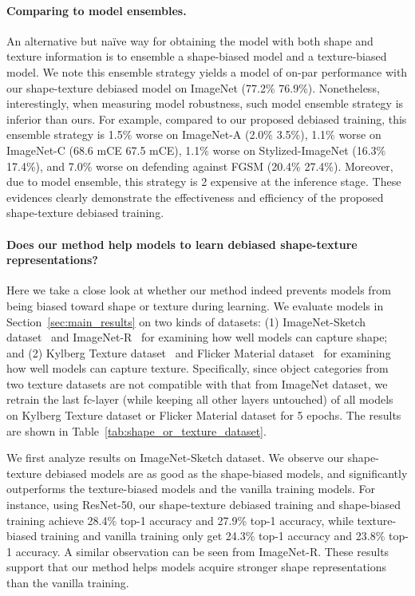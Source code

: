 \documentclass{article} \usepackage{iclr2021_conference,times}
\def\vs{{\bm{s}}}
\begin{document}
\paragraph{Comparing to model ensembles.}
An alternative but na\"ive way for obtaining the model with both shape and texture information is to ensemble a shape-biased model and a texture-biased model. We note this ensemble strategy yields a model of on-par performance with our shape-texture debiased model on ImageNet (77.2\% \vs 76.9\%). Nonetheless, interestingly, 
when measuring model robustness, such model ensemble strategy is inferior than ours. For example, compared to our proposed debiased training, this ensemble strategy is 1.5\% worse on ImageNet-A (2.0\% \vs 3.5\%), 1.1\% worse on ImageNet-C (68.6 mCE \vs 67.5 mCE), 1.1\% worse on Stylized-ImageNet (16.3\% \vs 17.4\%), and 7.0\% worse on defending against FGSM (20.4\% \vs 27.4\%). Moreover, due to model  ensemble, this strategy is 2 expensive at the inference stage. These evidences clearly demonstrate the effectiveness and efficiency of the proposed shape-texture debiased training.



\paragraph{Does our method help models to learn debiased shape-texture representations?}
Here we take a close look at whether our method indeed prevents models from being biased toward shape or texture during learning. We evaluate models in Section~\ref{sec:main_results} on two kinds of datasets: (1) ImageNet-Sketch dataset~\citep{wang2019learning} and ImageNet-R~\citep{hendrycks2020many} for examining how well models can capture shape; and
(2) Kylberg Texture dataset~\citep{kylberg2011kylberg} and Flicker Material dataset~\citep{Sharan-JoV-14} for examining how well models can capture texture. Specifically, since object categories from two texture datasets are not compatible with that from ImageNet dataset, we retrain the last fc-layer (while keeping all other layers untouched) of all models on Kylberg Texture dataset or Flicker Material dataset for 5 epochs. The results are shown in Table~\ref{tab:shape_or_texture_dataset}.

We first analyze results on ImageNet-Sketch dataset. We observe our shape-texture debiased models are as good as the shape-biased models, and significantly outperforms the texture-biased models and the vanilla training models. For instance, using ResNet-50, our shape-texture debiased training and shape-biased training achieve 28.4\% top-1 accuracy and 27.9\% top-1 accuracy, while texture-biased training and vanilla training only get 24.3\% top-1 accuracy and 23.8\% top-1 accuracy. A similar observation can be seen from ImageNet-R. These results support that our method helps models acquire stronger shape representations than the vanilla training. 
\end{document}
